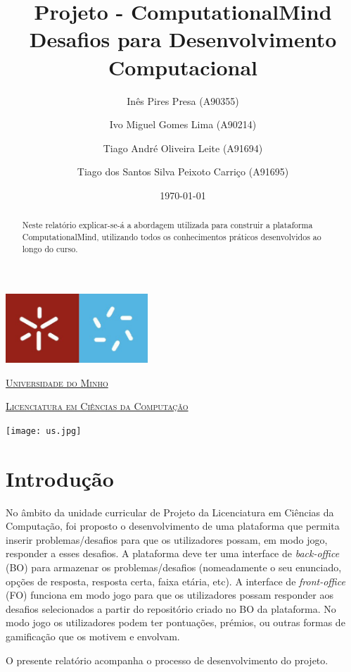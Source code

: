 \documentclass[11pt,a4paper]{report}
\title{Projeto - ComputationalMind\\ Desafios para Desenvolvimento  Computacional} %
\author{Inês Pires Presa (A90355)\and Ivo Miguel Gomes Lima (A90214)\and Tiago André Oliveira Leite (A91694)\and Tiago dos Santos Silva Peixoto Carriço (A91695)} %
\date{\today} %
\begin{document}
\clearpage
\thispagestyle{empty}

  \begin{minipage}{0.9\linewidth}
        \centering
    \includegraphics[width=0.4\textwidth]{um.jpeg}\par\vspace{1cm}
                \href{https://www.uminho.pt/PT}
    {\scshape\LARGE Universidade do Minho} \par
    \vspace{0.6cm}
                \href{https://lcc.di.uminho.pt}
    {\scshape\Large Licenciatura em Ciências da Computação} \par
    \maketitle
    \begin{center}
      \texttt{[image: us.jpg]}
\end{center}
  \end{minipage}

\begin{abstract}  %
Neste relatório explicar-se-á a abordagem utilizada para construir a plataforma ComputationalMind, utilizando todos os conhecimentos práticos desenvolvidos ao longo do curso.
\end{abstract}

\tableofcontents %

\chapter{Introdução}

No âmbito da unidade curricular de Projeto da Licenciatura em Ciências da Computação, foi proposto o desenvolvimento de uma plataforma que permita inserir problemas/desafios para que os utilizadores possam, em modo jogo, responder a esses desafios. A plataforma deve ter uma interface de \emph{back-office} (BO) para armazenar os problemas/desafios (nomeadamente o seu enunciado, opções de resposta, resposta certa, faixa etária, etc). 
A interface de \emph{front-office} (FO) funciona em modo jogo para que os utilizadores possam responder aos desafios selecionados a partir do repositório criado no BO da plataforma. No modo jogo os utilizadores podem ter pontuações, prémios, ou outras formas de gamificação que os motivem e envolvam. \par
O presente relatório acompanha o processo de desenvolvimento do projeto.
\end{document}
